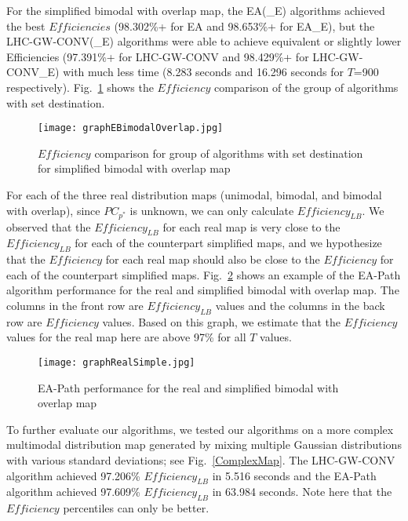 For the simplified bimodal with overlap map, the EA(\_E) algorithms achieved the best $\mathit{Efficiencies}$ (98.302\%+ for EA and 98.653\%+ for EA\_E), but the LHC-GW-CONV(\_E) algorithms were able to achieve equivalent or slightly lower Efficiencies (97.391\%+ for LHC-GW-CONV and 98.429\%+ for LHC-GW-CONV\_E) with much less time (8.283 seconds and 16.296 seconds for $T$=900 respectively). Fig.~\ref{graphEBimodalOverlap} shows the $\mathit{Efficiency}$ comparison of the group of algorithms with set destination.

\begin{figure}
\centering
\texttt{[image: graphEBimodalOverlap.jpg]}
\caption{$\mathit{Efficiency}$ comparison for group of algorithms with set destination for simplified bimodal with overlap map}
\label{graphEBimodalOverlap}
\end{figure}

For each of the three real distribution maps (unimodal, bimodal, and bimodal with overlap), since $PC_{p^*}$ is unknown, we can only calculate $\mathit{Efficiency_{LB}}$. We observed that the $\mathit{Efficiency_{LB}}$ for each real map is very close to the $\mathit{Efficiency_{LB}}$ for each of the counterpart simplified maps, and we hypothesize that the $\mathit{Efficiency}$ for each real map should also be close to the $\mathit{Efficiency}$ for each of the counterpart simplified maps. Fig.~\ref{graphRealSimple} shows an example of the EA-Path algorithm performance for the real and simplified bimodal with overlap map. The columns in the front row are $\mathit{Efficiency_{LB}}$ values and the columns in the back row are $\mathit{Efficiency}$ values. Based on this graph, we estimate that the $\mathit{Efficiency}$ values for the real map here are above 97\% for all $T$ values.

\begin{figure}
\centering
\texttt{[image: graphRealSimple.jpg]}
\caption{EA-Path performance for the real and simplified bimodal with overlap map}
\label{graphRealSimple}
\end{figure}

To further evaluate our algorithms, we tested our algorithms on a more complex multimodal distribution map generated by mixing multiple Gaussian distributions with various standard deviations; see Fig.~\ref{ComplexMap}. The LHC-GW-CONV algorithm achieved 97.206\% $\mathit{Efficiency_{LB}}$ in 5.516 seconds and the EA-Path algorithm achieved 97.609\% $\mathit{Efficiency_{LB}}$ in 63.984 seconds. Note here that the $\mathit{Efficiency}$ percentiles can only be better.

